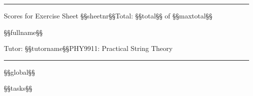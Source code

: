 \documentclass[12pt,a4paper]{article}
\begin{document}
\hrule
\smallskip

{\large Scores for Exercise Sheet §§sheetnr§§\hfill Total: §§total§§ of §§maxtotal§§}\smallskip

{\large §§fullname§§}\smallskip

{Tutor: §§tutorname§§\hfill PHY9911: Practical String Theory}

\smallskip
\hrule
\vspace{0.2cm}

§§global§§

§§tasks§§
\end{document}
